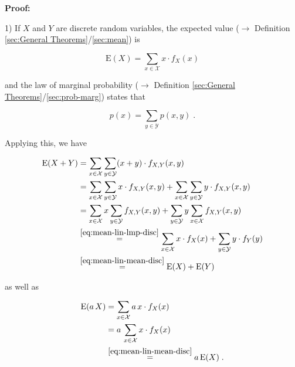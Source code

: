 \documentclass[a4paper,12pt,twoside]{book}
\begin{document}
\vspace{1em}
\textbf{Proof:}

1) If $X$ and $Y$ are discrete random variables, the expected value ($\rightarrow$ Definition \ref{sec:General Theorems}/\ref{sec:mean}) is

\begin{equation} \label{eq:mean-lin-mean-disc}
\mathrm{E}(X) = \sum_{x \in \mathcal{X}} x \cdot f_X(x)
\end{equation}

and the law of marginal probability ($\rightarrow$ Definition \ref{sec:General Theorems}/\ref{sec:prob-marg}) states that

\begin{equation} \label{eq:mean-lin-lmp-disc}
p(x) = \sum_{y \in \mathcal{Y}} p(x,y) \; .
\end{equation}

Applying this, we have

\begin{equation} \label{eq:mean-lin-mean-lin-s1-disc}
\begin{split}
\mathrm{E}(X + Y) &= \sum_{x \in \mathcal{X}} \sum_{y \in \mathcal{Y}} (x+y) \cdot f_{X,Y}(x,y) \\
&= \sum_{x \in \mathcal{X}} \sum_{y \in \mathcal{Y}} x \cdot f_{X,Y}(x,y) + \sum_{x \in \mathcal{X}} \sum_{y \in \mathcal{Y}} y \cdot f_{X,Y}(x,y) \\
&= \sum_{x \in \mathcal{X}} x \sum_{y \in \mathcal{Y}} f_{X,Y}(x,y) + \sum_{y \in \mathcal{Y}} y \sum_{x \in \mathcal{X}} f_{X,Y}(x,y) \\
&\overset{\eqref{eq:mean-lin-lmp-disc}}{=} \sum_{x \in \mathcal{X}} x \cdot f_X(x) + \sum_{y \in \mathcal{Y}} y \cdot f_{Y}(y) \\
&\overset{\eqref{eq:mean-lin-mean-disc}}{=} \mathrm{E}(X) + \mathrm{E}(Y)
\end{split}
\end{equation}

as well as

\begin{equation} \label{eq:mean-lin-mean-lin-s2-disc}
\begin{split}
\mathrm{E}(a\,X) &= \sum_{x \in \mathcal{X}} a \, x \cdot f_X(x) \\
&= a \, \sum_{x \in \mathcal{X}} x \cdot f_X(x) \\
&\overset{\eqref{eq:mean-lin-mean-disc}}{=} a \, \mathrm{E}(X) \; .
\end{split}
\end{equation}
\end{document}
